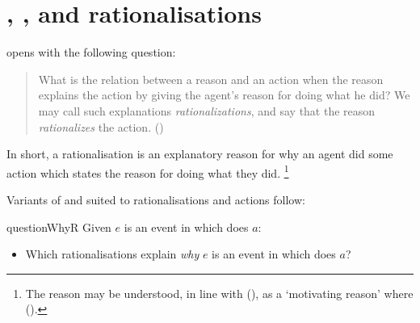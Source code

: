 \chapter*{\qWhy{}, \qHow{}, and rationalisations}
\label{sec:reasons}


\begin{note}
  \citeauthor{Davidson:1963aa} opens  with the following question:
  \begin{quote}
    What is the relation between a reason and an action when the reason explains the action by giving the agent's reason for doing what he did?
    We may call such explanations \emph{rationalizations}, and say that the reason \emph{rationalizes} the action.%
    \mbox{}\hfill\mbox{(\citeyear[685]{Davidson:1963aa})}
  \end{quote}
  In short, a rationalisation is an explanatory reason for why an agent did some action which states the \agents{} reason for doing what they did.%
  \footnote{
    The \agents{} reason may be understood, in line with \citeauthor{Smith:1994wo} (\citeyear{Smith:1994wo}), as a `motivating reason' where
    (\citeyear[96]{Smith:1994wo}).
  }

  Variants of \qWhy{} and \qHow{} suited to rationalisations and actions follow:

  \begin{question}{questionWhyR}{\qWhyR{}}
    Given \(e\) is an event in which \vAgent{} does \(a\):

    \begin{itemize}
    \item
      Which rationalisations explain \emph{why} \(e\) is an event in which \vAgent{} does \(a\)?
    \end{itemize}
    \vspace{-1.5\baselineskip}
  \end{question}


\end{note}

